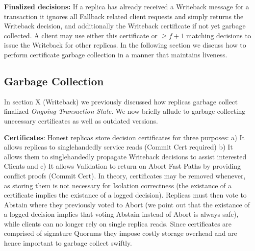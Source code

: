 
\textbf{Finalized decisions:} If a replica has already received a Writeback message for a transaction it ignores all Fallback related client requests and simply returns the Writeback decision, and additionally the Writeback certificate if not yet garbage collected. A client may use either this certificate or $\geq f+1$ matching decisions to issue the Writeback for other replicas. In the following section we discuss how to perform certificate garbage collection in a manner that maintains liveness.

\subsection{Garbage Collection}
In section X (Writeback) we previously discussed how replicas garbage collect finalized \textit{Ongoing Transaction State}. 
We now briefly allude to garbage collecting unecessary certificates as well as outdated versions.




\textbf{Certificates}: Honest replicas store decision certificates for three purposes: a) It allows replicas to singlehandedly service reads (Commit Cert required) b) It allows them to singlehandedly propagate Writeback decisions to assist interested Clients and c) It allows Validation to return on Abort Fast Paths by providing conflict proofs (Commit Cert).
In theory, certificates may be removed whenever, as storing them is not necessary for Isolation correctness (the existance of a certificate implies the existance of a logged decision). Replicas  must then vote to Abstain where they previously voted to Abort (we point out that the existance of a logged decision implies that voting Abstain instead of Abort is always safe), while clients can no longer rely on single replica reads. Since certificates are comprised of signature Quorums they impose costly storage overhead and are hence important to garbage collect swiftly.

